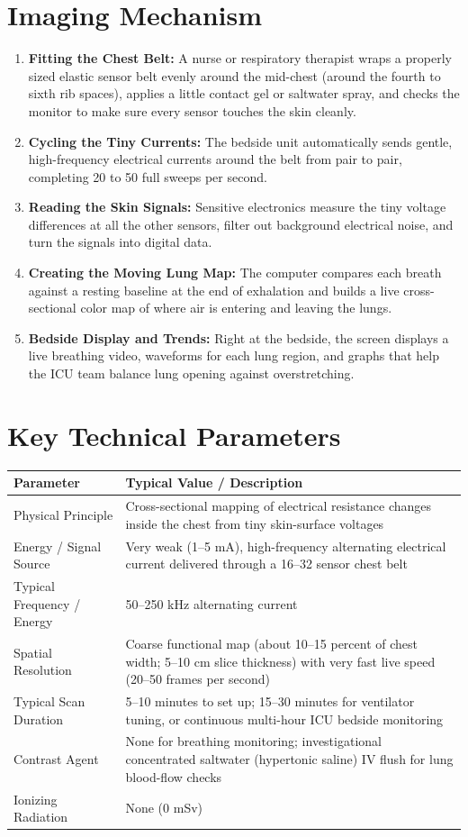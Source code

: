 \section{Imaging Mechanism}
\begin{enumerate}
    \item \textbf{Fitting the Chest Belt:} A nurse or respiratory therapist wraps a properly sized elastic sensor belt evenly around the mid-chest (around the fourth to sixth rib spaces), applies a little contact gel or saltwater spray, and checks the monitor to make sure every sensor touches the skin cleanly.
    \item \textbf{Cycling the Tiny Currents:} The bedside unit automatically sends gentle, high-frequency electrical currents around the belt from pair to pair, completing 20 to 50 full sweeps per second.
    \item \textbf{Reading the Skin Signals:} Sensitive electronics measure the tiny voltage differences at all the other sensors, filter out background electrical noise, and turn the signals into digital data.
    \item \textbf{Creating the Moving Lung Map:} The computer compares each breath against a resting baseline at the end of exhalation and builds a live cross-sectional color map of where air is entering and leaving the lungs.
    \item \textbf{Bedside Display and Trends:} Right at the bedside, the screen displays a live breathing video, waveforms for each lung region, and graphs that help the ICU team balance lung opening against overstretching.
\end{enumerate}

\section{Key Technical Parameters}
\noindent
\begin{tabularx}{\textwidth}{@{}l X@{}}
\toprule
\textbf{Parameter} & \textbf{Typical Value / Description} \\
\midrule
Physical Principle & Cross-sectional mapping of electrical resistance changes inside the chest from tiny skin-surface voltages \\
Energy / Signal Source & Very weak (1--5 mA), high-frequency alternating electrical current delivered through a 16--32 sensor chest belt \\
Typical Frequency / Energy & 50--250 kHz alternating current \\
Spatial Resolution & Coarse functional map (about 10--15 percent of chest width; 5--10 cm slice thickness) with very fast live speed (20--50 frames per second) \\
Typical Scan Duration & 5--10 minutes to set up; 15--30 minutes for ventilator tuning, or continuous multi-hour ICU bedside monitoring \\
Contrast Agent & None for breathing monitoring; investigational concentrated saltwater (hypertonic saline) IV flush for lung blood-flow checks \\
Ionizing Radiation & None (0 mSv) \\
\bottomrule
\end{tabularx}

